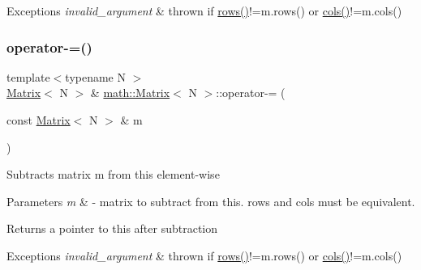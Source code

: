 \begin{DoxyExceptions}{Exceptions}
{\em invalid\+\_\+argument} & thrown if {\ttfamily \hyperlink{classmath_1_1Matrix_a602173645d806afe305ed77b1ff38273}{rows()}!=m.\+rows()} or {\ttfamily \hyperlink{classmath_1_1Matrix_ad78b49e12a607856df124a18a855aaf1}{cols()}!=m.\+cols()} \\
\hline
\end{DoxyExceptions}
\mbox{\label{classmath_1_1Matrix_a046b9f4717da34fb08795cb461497084}} 
\subsubsection{\texorpdfstring{operator-\/=()}{operator-=()}}
{\footnotesize\ttfamily template$<$typename N $>$ \\
\hyperlink{classmath_1_1Matrix}{Matrix}$<$ N $>$ \& \hyperlink{classmath_1_1Matrix}{math\+::\+Matrix}$<$ N $>$\+::operator-\/= (\begin{DoxyParamCaption}\item[{const \hyperlink{classmath_1_1Matrix}{Matrix}$<$ N $>$ \&}]{m }\end{DoxyParamCaption})}

Subtracts matrix {\ttfamily m} from {\ttfamily this} element-\/wise 
\begin{DoxyParams}{Parameters}
{\em m} & -\/ matrix to subtract from {\ttfamily this}. rows and cols must be equivalent. \\
\hline
\end{DoxyParams}
\begin{DoxyReturn}{Returns}
a pointer to {\ttfamily this} after subtraction 
\end{DoxyReturn}

\begin{DoxyExceptions}{Exceptions}
{\em invalid\+\_\+argument} & thrown if {\ttfamily \hyperlink{classmath_1_1Matrix_a602173645d806afe305ed77b1ff38273}{rows()}!=m.\+rows()} or {\ttfamily \hyperlink{classmath_1_1Matrix_ad78b49e12a607856df124a18a855aaf1}{cols()}!=m.\+cols()} \\
\hline
\end{DoxyExceptions}
\mbox{\label{classmath_1_1Matrix_a6a0a90575952ca84cac100cb40a5e9d0}} 
